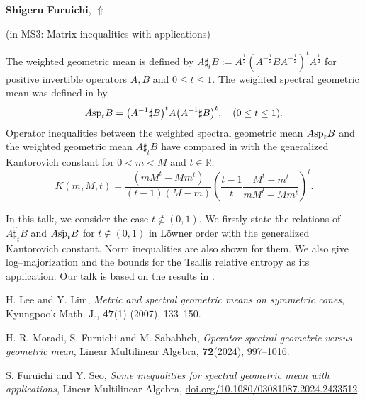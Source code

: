 \documentclass[ILAS2025-program.tex]{subfiles}
\begin{document}
\hypertarget{down0144}{}\begin{ilasabstract}
    
\textbf{Shigeru Furuichi},  \hfill \hyperlink{up0144}{$\Uparrow$}
    
    
(in {\color{mstitle}MS3: Matrix inequalities with applications})
        
\mtskip
    \begin{bibunit}
        The weighted geometric mean is defined by $A\sharp_t B:=A^{\frac{1}{2}}\left(A^{-\frac{1}{2}}BA^{-\frac{1}{2}}\right)^t A^{\frac{1}{2}}$ for positive invertible operators $A,B$ and $0\leq t\leq 1.$ 
The weighted spectral geometric mean was defined in \cite{Lee1} by
\[A{{{\rm sp}}_{t}}B={{\left( {{A}^{-1}}\sharp B \right)}^{t}}A{{\left( {{A}^{-1}}\sharp B \right)}^{t}},\quad (0\leq t\leq 1).\]
Operator inequalities between the weighted spectral geometric mean $A{\rm sp}_t B$ and the weighted geometric mean $A\sharp_tB$ have compared in \cite{MFS2023} with the generalized Kantorovich constant for $0<m<M$ and $t\in \mathbb{R}$:
\[K\left( m,M,t \right)=\frac{\left(m{{M}^{t}}-M{{m}^{t}}\right)}{\left( t-1 \right)\left( M-m \right)}{{\left( \frac{t-1}{t}\frac{{{M}^{t}}-{{m}^{t}}}{m{{M}^{t}}-M{{m}^{t}}} \right)}^{t}}.\]
	
In this talk, we consider the case $t\notin (0,1)$. We firstly state the relations of $A\hat\sharp_t B$ and $A{{\hat{\rm sp}}_{t}}B$ for $t\notin (0,1)$ in L\"{o}wner order with the generalized Kantorovich constant. Norm inequalities are also shown for them.
We also give log--majorization and the bounds for the Tsallis relative entropy as its application.
Our talk is based on the results in \cite{FS2024}.


\begin{thebibliography}{5}

 H. Lee and Y. Lim, {\it Metric and spectral geometric means on symmetric cones}, Kyungpook Math. J., {\bf47}(1) (2007), 133--150.

H. R. Moradi, S. Furuichi and M. Sababheh, {\it Operator spectral geometric versus geometric mean}, 	Linear Multilinear Algebra, {\bf 72}(2024), 997--1016.


 S. Furuichi and Y. Seo, {\it Some inequalities for spectral geometric mean
with applications}, Linear Multilinear Algebra, \url{doi.org/10.1080/03081087.2024.2433512}.
\end{thebibliography}
        \end{bibunit}
        
\end{ilasabstract}
    
\end{document}
